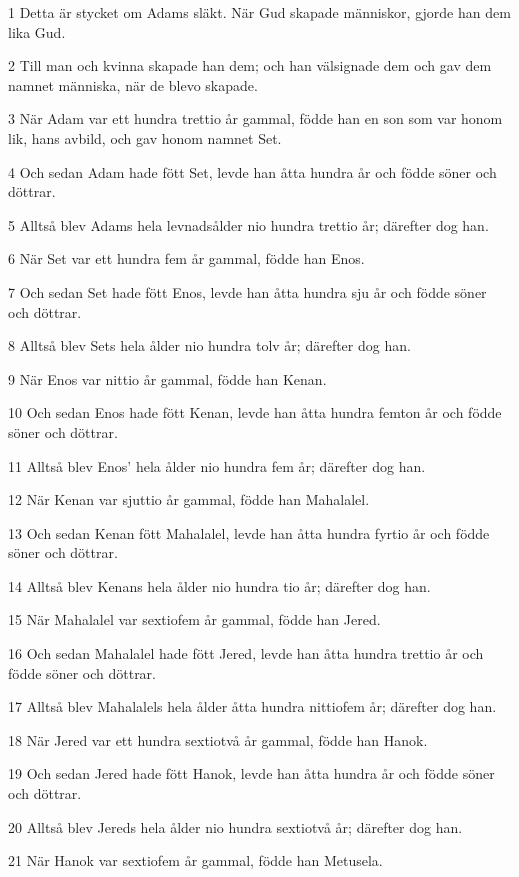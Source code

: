 \par 1 Detta är stycket om Adams släkt. När Gud skapade människor, gjorde han dem lika Gud.
\par 2 Till man och kvinna skapade han dem; och han välsignade dem och gav dem namnet människa, när de blevo skapade.
\par 3 När Adam var ett hundra trettio år gammal, födde han en son som var honom lik, hans avbild, och gav honom namnet Set.
\par 4 Och sedan Adam hade fött Set, levde han åtta hundra år och födde söner och döttrar.
\par 5 Alltså blev Adams hela levnadsålder nio hundra trettio år; därefter dog han.
\par 6 När Set var ett hundra fem år gammal, födde han Enos.
\par 7 Och sedan Set hade fött Enos, levde han åtta hundra sju år och födde söner och döttrar.
\par 8 Alltså blev Sets hela ålder nio hundra tolv år; därefter dog han.
\par 9 När Enos var nittio år gammal, födde han Kenan.
\par 10 Och sedan Enos hade fött Kenan, levde han åtta hundra femton år och födde söner och döttrar.
\par 11 Alltså blev Enos' hela ålder nio hundra fem år; därefter dog han.
\par 12 När Kenan var sjuttio år gammal, födde han Mahalalel.
\par 13 Och sedan Kenan fött Mahalalel, levde han åtta hundra fyrtio år och födde söner och döttrar.
\par 14 Alltså blev Kenans hela ålder nio hundra tio år; därefter dog han.
\par 15 När Mahalalel var sextiofem år gammal, födde han Jered.
\par 16 Och sedan Mahalalel hade fött Jered, levde han åtta hundra trettio år och födde söner och döttrar.
\par 17 Alltså blev Mahalalels hela ålder åtta hundra nittiofem år; därefter dog han.
\par 18 När Jered var ett hundra sextiotvå år gammal, födde han Hanok.
\par 19 Och sedan Jered hade fött Hanok, levde han åtta hundra år och födde söner och döttrar.
\par 20 Alltså blev Jereds hela ålder nio hundra sextiotvå år; därefter dog han.
\par 21 När Hanok var sextiofem år gammal, födde han Metusela.
